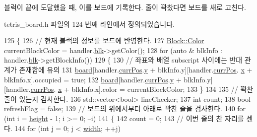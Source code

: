 블럭이 끝에 도달했을 때, 이를 보드에 기록한다. 줄이 꽉찼다면 보드를 새로 고친다. 



tetris\+\_\+board.\+h 파일의 124 번째 라인에서 정의되었습니다.


\begin{DoxyCode}
125     \{
126         \textcolor{comment}{// 현재 블럭의 정보를 보드에 반영한다.}
127         \mbox{\hyperlink{class_block_ad054b4ac51df79aa910040b2a2fdf7b5}{Block::Color}} currentBlockColor = handler.\mbox{\hyperlink{class_block_handler_ab57212ded2552ab5559d278c8538c454}{blk}}->getColor();
128         \textcolor{keywordflow}{for} (\textcolor{keyword}{auto} & blkInfo : handler.\mbox{\hyperlink{class_block_handler_ab57212ded2552ab5559d278c8538c454}{blk}}->getBlockInfo())
129         \{
130             \textcolor{comment}{// 좌표와 배열 subscript 사이에는 반대 관계가 존재함에 유의}
131             \mbox{\hyperlink{class_board_ad26aada4f19d2ca0c7bd534e8f466b6b}{board}}[handler.\mbox{\hyperlink{class_block_handler_a11bd634fdc179446f9c6751e2394999e}{currPos}}.\mbox{\hyperlink{struct_coord_a214166cca70cef7dda9201689c3e81ab}{y}} + blkInfo.y][handler.\mbox{\hyperlink{class_block_handler_a11bd634fdc179446f9c6751e2394999e}{currPos}}.
      \mbox{\hyperlink{struct_coord_a696eaa744360fc791d0e3b331c549dbe}{x}} + blkInfo.x].occupied = \textcolor{keyword}{true};
132             \mbox{\hyperlink{class_board_ad26aada4f19d2ca0c7bd534e8f466b6b}{board}}[handler.\mbox{\hyperlink{class_block_handler_a11bd634fdc179446f9c6751e2394999e}{currPos}}.\mbox{\hyperlink{struct_coord_a214166cca70cef7dda9201689c3e81ab}{y}} + blkInfo.y][handler.\mbox{\hyperlink{class_block_handler_a11bd634fdc179446f9c6751e2394999e}{currPos}}.
      \mbox{\hyperlink{struct_coord_a696eaa744360fc791d0e3b331c549dbe}{x}} + blkInfo.x].color = currentBlockColor;
133         \}
134 
135         \textcolor{comment}{// 꽉찬 줄이 있는지 검사한다.}
136         std::vector<bool> lineChecker;
137         \textcolor{keywordtype}{int} count;
138         \textcolor{keywordtype}{bool} refreshFlag = \textcolor{keyword}{false};
139         \textcolor{comment}{// 보드의 위에서부터 아래로 꽉찬 줄을 검사한다.}
140         \textcolor{keywordflow}{for} (\textcolor{keywordtype}{int} i = \mbox{\hyperlink{class_board_a37b65287f3b416ed31b0f15cfd9b3f7c}{height}} - 1; i >= 0; --i)
141         \{
142             count = 0;
143             \textcolor{comment}{// 이번 줄의 찬 자리를 센다.}
144             \textcolor{keywordflow}{for} (\textcolor{keywordtype}{int} j = 0; j < \mbox{\hyperlink{class_board_a5c5b64d99e3c653c425206d2babf2f97}{width}}; ++j)

\end{DoxyCode}
